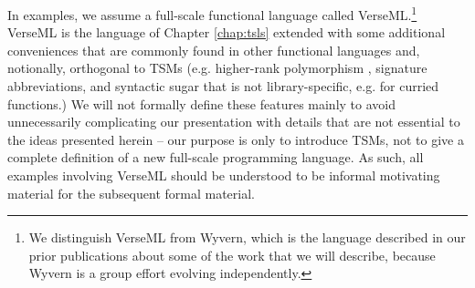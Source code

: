 In examples, we assume a full-scale functional language called VerseML.\footnote{We distinguish VerseML from Wyvern, which is the language described in our prior publications about some of the work that we will describe, because Wyvern is a group effort evolving independently.} VerseML is the language of Chapter \ref{chap:tsls}  extended with some additional conveniences that are commonly found in other functional languages and, notionally, orthogonal to TSMs (e.g. higher-rank polymorphism \cite{conf/icfp/DunfieldK13}, signature abbreviations, and syntactic sugar that is not library-specific, e.g. for curried functions.) %
We will not formally define these features mainly to avoid unnecessarily complicating our presentation with details that are not essential to the ideas presented herein -- our purpose is only to introduce TSMs, not to give a complete definition of  a new full-scale programming language. As such, all examples involving VerseML should be understood to be informal motivating material for the subsequent formal material. %



